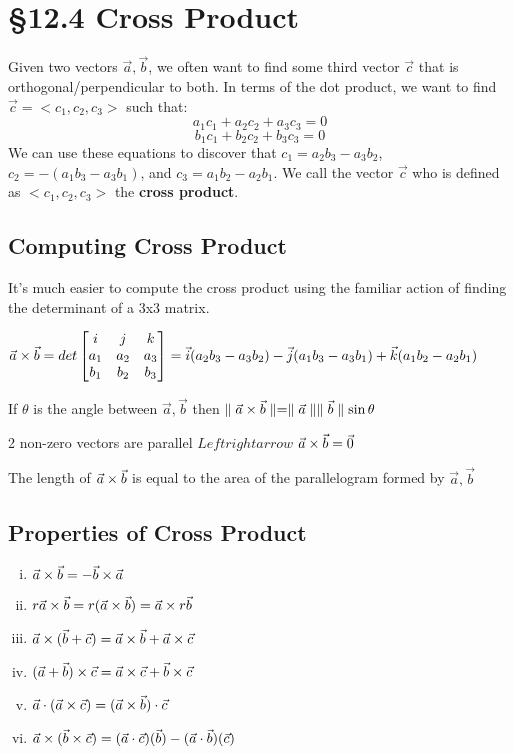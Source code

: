 \documentclass[12 pt]{article}
\begin{document}
	\section{\S 12.4 Cross Product}
		Given two vectors $\vec{a},\vec{b}$, we often want to find some third vector $\vec{c}$ that is orthogonal/perpendicular to both. In terms of the dot product, we want to find $\vec{c}=<c_1,c_2,c_3>$ such that:
		$$a_1c_1+a_2c_2+a_3c_3=0$$
		$$b_1c_1+b_2c_2+b_3c_3=0$$
		We can use these equations to discover that $c_1=a_2b_3-a_3b_2$, $c_2=-(a_1b_3-a_3b_1)$, and $c_3=a_1b_2-a_2b_1$. We call the vector $\vec{c}$ who is defined as $<c_1,c_2,c_3>$ the \textbf{cross product}.

		\subsection{Computing Cross Product}

		It's much easier to compute the cross product using the familiar action of finding the determinant of a 3x3 matrix.\\
		\begin{center}
		$\vec{a}\times\vec{b}=det
		\begin{bmatrix}
			i & j & k \\
			a_1 & a_2 & a_3 \\
			b_1 & b_2 & b_3
		\end{bmatrix}
		=\vec{i}(a_2b_3-a_3b_2)-\vec{j}(a_1b_3-a_3b_1)+\vec{k}(a_1b_2-a_2b_1)$
		\end{center}
		\begin{thrm}
			If $\theta$ is the angle between $\vec{a}, \vec{b}$ then
			$\parallel \vec{a}\times\vec{b}\parallel=\parallel \vec{a} \parallel\parallel \vec{b} \parallel\sin{\theta}$
		\end{thrm}
		\begin{remark}
			2 non-zero vectors are parallel $Leftrightarrow$ $\vec{a}\times\vec{b}=\vec{0}$
		\end{remark}
		\begin{remark}
			The length of $\vec{a}\times\vec{b}$ is equal to the area of the parallelogram formed by $\vec{a},\vec{b}$
		\end{remark}

		\subsection{Properties of Cross Product}

		\begin{enumerate}[i)]
			\item $\vec{a}\times\vec{b}=-\vec{b}\times\vec{a}$
			\item $r\vec{a}\times\vec{b}=r(\vec{a}\times\vec{b})=\vec{a}\times r\vec{b}$
			\item $\vec{a}\times (\vec{b}+\vec{c})=\vec{a}\times\vec{b}+\vec{a}\times\vec{c}$
			\item $(\vec{a}+\vec{b})\times\vec{c}=\vec{a}\times\vec{c}+\vec{b}\times\vec{c}$
			\item $\vec{a}\cdot (\vec{a}\times\vec{c})=(\vec{a}\times\vec{b})\cdot \vec{c}$
			\item $\vec{a}\times (\vec{b}\times\vec{c})=(\vec{a}\cdot\vec{c})(\vec{b})-(\vec{a}\cdot\vec{b})(\vec{c})$
		\end{enumerate}
\end{document}
